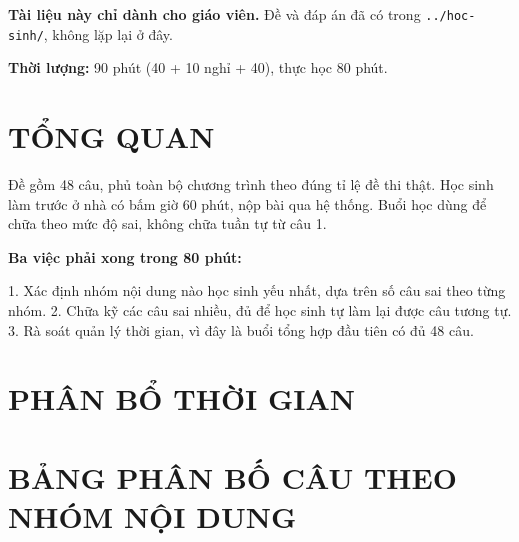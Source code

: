 \documentclass[11pt, a4paper]{article}
\begin{document}

\textbf{Tài liệu này chỉ dành cho giáo viên.} Đề và đáp án đã có trong \texttt{../hoc-sinh/}, không lặp lại ở đây.

\textbf{Thời lượng:} 90 phút (40 + 10 nghỉ + 40), thực học 80 phút.

\section{TỔNG QUAN}

Đề gồm 48 câu, phủ toàn bộ chương trình theo đúng tỉ lệ đề thi thật. Học sinh làm trước ở nhà có bấm giờ 60 phút, nộp bài qua hệ thống. Buổi học dùng để chữa theo mức độ sai, không chữa tuần tự từ câu 1.

\textbf{Ba việc phải xong trong 80 phút:}

1. Xác định nhóm nội dung nào học sinh yếu nhất, dựa trên số câu sai theo từng nhóm.
2. Chữa kỹ các câu sai nhiều, đủ để học sinh tự làm lại được câu tương tự.
3. Rà soát quản lý thời gian, vì đây là buổi tổng hợp đầu tiên có đủ 48 câu.

\section{PHÂN BỔ THỜI GIAN}


\section{BẢNG PHÂN BỐ CÂU THEO NHÓM NỘI DUNG}
\end{document}
